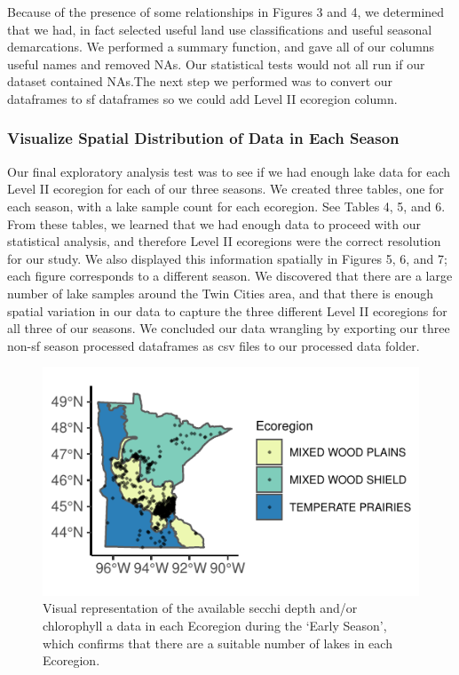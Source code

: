 \documentclass[12pt,]{article}
\begin{document}
Because of the presence of some relationships in Figures 3 and 4, we
determined that we had, in fact selected useful land use classifications
and useful seasonal demarcations. We performed a summary function, and
gave all of our columns useful names and removed NAs. Our statistical
tests would not all run if our dataset contained NAs.The next step we
performed was to convert our dataframes to sf dataframes so we could add
Level II ecoregion column.

\hypertarget{visualize-spatial-distribution-of-data-in-each-season}{%
\subsubsection{Visualize Spatial Distribution of Data in Each
Season}\label{visualize-spatial-distribution-of-data-in-each-season}}

Our final exploratory analysis test was to see if we had enough lake
data for each Level II ecoregion for each of our three seasons. We
created three tables, one for each season, with a lake sample count for
each ecoregion. See Tables 4, 5, and 6. From these tables, we learned
that we had enough data to proceed with our statistical analysis, and
therefore Level II ecoregions were the correct resolution for our study.
We also displayed this information spatially in Figures 5, 6, and 7;
each figure corresponds to a different season. We discovered that there
are a large number of lake samples around the Twin Cities area, and that
there is enough spatial variation in our data to capture the three
different Level II ecoregions for all three of our seasons. We concluded
our data wrangling by exporting our three non-sf season processed
dataframes as csv files to our processed data folder.

\begin{figure}
\centering
\includegraphics{Bollt_Greif_Raby_Roth_Project_Final_files/figure-latex/unnamed-chunk-10-1.pdf}
\caption{Visual representation of the available secchi depth and/or
chlorophyll a data in each Ecoregion during the `Early Season', which
confirms that there are a suitable number of lakes in each Ecoregion.}
\end{figure}
\end{document}
